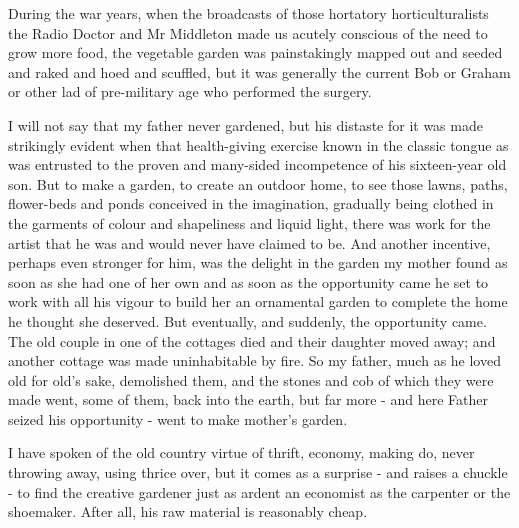 During the war years, when the broadcasts of those hortatory horticulturalists the Radio Doctor and Mr Middleton made us acutely conscious of the need to grow more food, the vegetable garden was painstakingly mapped out and seeded and raked and hoed and scuffled, but it was generally the current Bob or Graham or other lad of pre-military age who performed the surgery.

I will not say that my father never gardened, but his distaste for it was made strikingly evident when that health-giving exercise known in the classic tongue as  was entrusted to the proven and many-sided incompetence of his sixteen-year old son. But to make a garden, to create an outdoor home, to see those lawns, paths, flower-beds and ponds conceived in the imagination, gradually being clothed in the garments of colour and shapeliness and liquid light, there was work for the artist that he was and would never have claimed to be. And another incentive, perhaps even stronger for him, was the delight in the garden my mother found as soon as she had one of her own and as soon as the opportunity came he set to work with all his vigour to build her an ornamental garden to complete the home he thought she deserved. But eventually, and suddenly, the opportunity came. The old couple in one of the cottages died and their daughter moved away; and another cottage was made uninhabitable by fire. So my father, much as he loved old for old's sake, demolished them, and the stones and cob of which they were made went, some of them, back into the earth, but far more - and here Father seized his opportunity - went to make mother's garden.

I have spoken of the old country virtue of thrift, economy, making do, never throwing away, using thrice over, but it comes as a surprise - and raises a chuckle - to find the creative gardener just as ardent an economist as the carpenter or the shoemaker. After all, his raw material is reasonably cheap.

